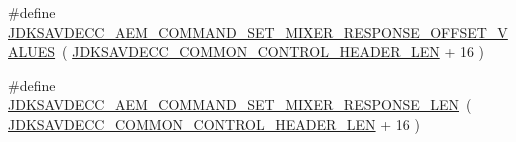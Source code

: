 \begin{DoxyCompactItemize}
\item 
\#define \hyperlink{group__command__set__mixer__response_ga0701b5d43f15913871c659aebe4198de}{J\+D\+K\+S\+A\+V\+D\+E\+C\+C\+\_\+\+A\+E\+M\+\_\+\+C\+O\+M\+M\+A\+N\+D\+\_\+\+S\+E\+T\+\_\+\+M\+I\+X\+E\+R\+\_\+\+R\+E\+S\+P\+O\+N\+S\+E\+\_\+\+O\+F\+F\+S\+E\+T\+\_\+\+V\+A\+L\+U\+ES}~( \hyperlink{group__jdksavdecc__avtp__common__control__header_gaae84052886fb1bb42f3bc5f85b741dff}{J\+D\+K\+S\+A\+V\+D\+E\+C\+C\+\_\+\+C\+O\+M\+M\+O\+N\+\_\+\+C\+O\+N\+T\+R\+O\+L\+\_\+\+H\+E\+A\+D\+E\+R\+\_\+\+L\+EN} + 16 )
\item 
\#define \hyperlink{group__command__set__mixer__response_gae5086f4bb1dae77f0b296520dcde9cd2}{J\+D\+K\+S\+A\+V\+D\+E\+C\+C\+\_\+\+A\+E\+M\+\_\+\+C\+O\+M\+M\+A\+N\+D\+\_\+\+S\+E\+T\+\_\+\+M\+I\+X\+E\+R\+\_\+\+R\+E\+S\+P\+O\+N\+S\+E\+\_\+\+L\+EN}~( \hyperlink{group__jdksavdecc__avtp__common__control__header_gaae84052886fb1bb42f3bc5f85b741dff}{J\+D\+K\+S\+A\+V\+D\+E\+C\+C\+\_\+\+C\+O\+M\+M\+O\+N\+\_\+\+C\+O\+N\+T\+R\+O\+L\+\_\+\+H\+E\+A\+D\+E\+R\+\_\+\+L\+EN} + 16 )
\end{DoxyCompactItemize}
